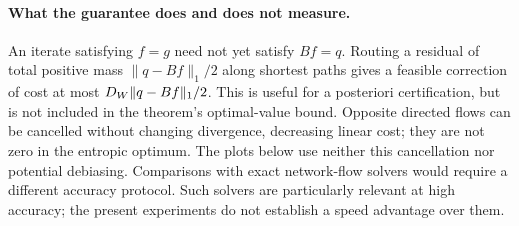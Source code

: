 \paragraph{What the guarantee does and does not measure.}
An iterate satisfying $f=g$ need not yet satisfy $Bf=q$. Routing a residual of total positive mass $\|q-Bf\|_1/2$ along shortest paths gives a feasible correction of cost at most $D_W\|q-Bf\|_1/2$. This is useful for a posteriori certification, but is not included in the theorem's optimal-value bound. Opposite directed flows can be cancelled without changing divergence, decreasing linear cost; they are not zero in the entropic optimum. The plots below use neither this cancellation nor potential debiasing. Comparisons with exact network-flow solvers would require a different accuracy protocol. Such solvers are particularly relevant at high accuracy; the present experiments do not establish a speed advantage over them.


